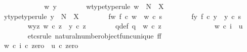 \begin{isabellebody}
\ \ \ \ \isamarkupfalse%
\isanewline
\ \ \ \ \ \ \isamarkupfalse%
\ w\ y\isanewline
\ \ \ \ \ \ \isamarkupfalse%
\ w{\isacharunderscore}{\kern0pt}type{\isacharbrackleft}{\kern0pt}type{\isacharunderscore}{\kern0pt}rule{\isacharbrackright}{\kern0pt}{\isacharcolon}{\kern0pt}\ {\isachardoublequoteopen}w\ {\isacharcolon}{\kern0pt}\ N\ {\isasymrightarrow}\ X{\isachardoublequoteclose}\isanewline
\ \ \ \ \ \ \isamarkupfalse%
\ y{\isacharunderscore}{\kern0pt}type{\isacharbrackleft}{\kern0pt}type{\isacharunderscore}{\kern0pt}rule{\isacharbrackright}{\kern0pt}{\isacharcolon}{\kern0pt}\ {\isachardoublequoteopen}y\ {\isacharcolon}{\kern0pt}\ N\ {\isasymrightarrow}\ X{\isachardoublequoteclose}\isanewline
\ \ \ \ \ \ \isamarkupfalse%
\ f{\isacharunderscore}{\kern0pt}w{\isacharcolon}{\kern0pt}\ {\isachardoublequoteopen}f\ {\isasymcirc}\isactrlsub c\ w\ {\isacharequal}{\kern0pt}\ w\ {\isasymcirc}\isactrlsub c\ s{\isachardoublequoteclose}\isanewline
\ \ \ \ \ \ \isamarkupfalse%
\ f{\isacharunderscore}{\kern0pt}y{\isacharcolon}{\kern0pt}\ {\isachardoublequoteopen}f\ {\isasymcirc}\isactrlsub c\ y\ {\isacharequal}{\kern0pt}\ y\ {\isasymcirc}\isactrlsub c\ s{\isachardoublequoteclose}\isanewline
\ \ \ \ \ \ \isamarkupfalse%
\ w{\isacharunderscore}{\kern0pt}y{\isacharunderscore}{\kern0pt}z{\isacharcolon}{\kern0pt}\ {\isachardoublequoteopen}w\ {\isasymcirc}\isactrlsub c\ z\ {\isacharequal}{\kern0pt}\ y\ {\isasymcirc}\isactrlsub c\ z{\isachardoublequoteclose}\isanewline
\ \ \ \ \ \ \isamarkupfalse%
\ q{\isacharunderscore}{\kern0pt}def{\isacharcolon}{\kern0pt}\ {\isachardoublequoteopen}q\ {\isacharequal}{\kern0pt}\ w\ {\isasymcirc}\isactrlsub c\ z{\isachardoublequoteclose}\isanewline
\ \ \ \ \ \ \isanewline
\isanewline
\isanewline
\ \ \ \ \ \ \isamarkupfalse%
\ {\isachardoublequoteopen}w\ {\isasymcirc}\isactrlsub c\ i\ {\isacharequal}{\kern0pt}\ u{\isachardoublequoteclose}\isanewline
\ \ \ \ \ \ \isamarkupfalse%
\ {\isacharparenleft}{\kern0pt}etcs{\isacharunderscore}{\kern0pt}rule\ natural{\isacharunderscore}{\kern0pt}number{\isacharunderscore}{\kern0pt}object{\isacharunderscore}{\kern0pt}func{\isacharunderscore}{\kern0pt}unique{\isacharbrackleft}{\kern0pt}\ f{\isacharequal}{\kern0pt}f{\isacharbrackright}{\kern0pt}{\isacharparenright}{\kern0pt}\isanewline
\ \ \ \ \ \ \ \ \isamarkupfalse%
\ {\isachardoublequoteopen}{\isacharparenleft}{\kern0pt}w\ {\isasymcirc}\isactrlsub c\ i{\isacharparenright}{\kern0pt}\ {\isasymcirc}\isactrlsub c\ zero\ {\isacharequal}{\kern0pt}\ u\ {\isasymcirc}\isactrlsub c\ zero{\isachardoublequoteclose}\isanewline

\end{isabellebody}
